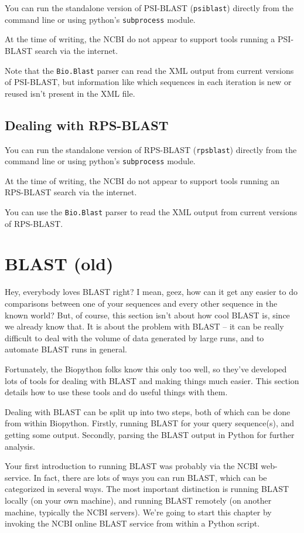 You can run the standalone version of PSI-BLAST (\verb|psiblast|) directly
from the command line or using python's \verb|subprocess| module.

At the time of writing, the NCBI do not appear to support tools running a
PSI-BLAST search via the internet.

Note that the \verb|Bio.Blast| parser can read the XML output from
current versions of PSI-BLAST, but information like which sequences in each
iteration is new or reused isn't present in the XML file.

\section{Dealing with RPS-BLAST}

You can run the standalone version of RPS-BLAST (\verb|rpsblast|) directly
from the command line or using python's \verb|subprocess| module.

At the time of writing, the NCBI do not appear to support tools running an
RPS-BLAST search via the internet.

You can use the \verb|Bio.Blast| parser to read the XML output from
current versions of RPS-BLAST.

\chapter{BLAST (old)}
\label{chapter:blast_old}
Hey, everybody loves BLAST right? I mean, geez, how can it get any easier to do comparisons between one of your sequences and every other sequence in the known world? But, of course, this section isn't about how cool BLAST is, since we already know that. It is about the problem with BLAST -- it can be really difficult to deal with the volume of data generated by large runs, and to automate BLAST runs in general.

Fortunately, the Biopython folks know this only too well, so they've developed lots of tools for dealing with BLAST and making things much easier. This section details how to use these tools and do useful things with them.

Dealing with BLAST can be split up into two steps, both of which can be done from within Biopython.
Firstly, running BLAST for your query sequence(s), and getting some output.
Secondly, parsing the BLAST output in Python for further analysis.

Your first introduction to running BLAST was probably via the NCBI web-service.
In fact, there are lots of ways you can run BLAST, which can be categorized in several ways.
The most important distinction is running BLAST locally (on your own machine),
and running BLAST remotely (on another machine, typically the NCBI servers).
We're going to start this chapter by invoking the NCBI online BLAST service
from within a Python script.

